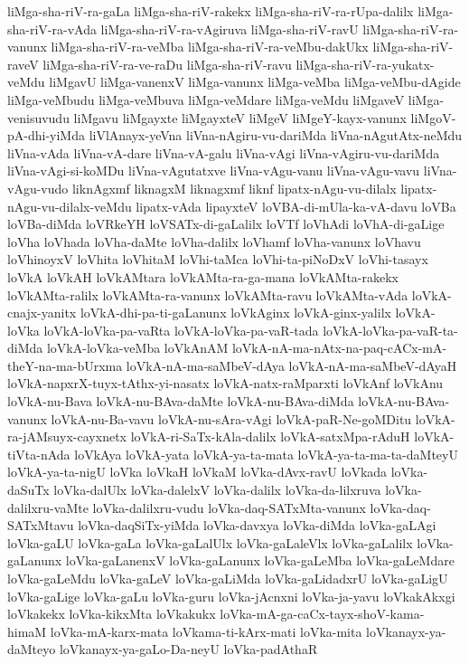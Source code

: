 {liMga-sha-riV-ra-gaLa
liMga-sha-riV-rakekx
liMga-sha-riV-ra-rUpa-dalilx
liMga-sha-riV-ra-vAda
liMga-sha-riV-ra-vAgiruva
liMga-sha-riV-ravU
liMga-sha-riV-ra-vanunx
liMga-sha-riV-ra-veMba
liMga-sha-riV-ra-veMbu-dakUkx
liMga-sha-riV-raveV
liMga-sha-riV-ra-ve-raDu
liMga-sha-riV-ravu
liMga-sha-riV-ra-yukatx-veMdu
liMgavU
liMga-vanenxV
liMga-vanunx
liMga-veMba
liMga-veMbu-dAgide
liMga-veMbudu
liMga-veMbuva
liMga-veMdare
liMga-veMdu
liMgaveV
liMga-venisuvudu
liMgavu
liMgayxte
liMgayxteV
liMgeV
liMgeY-kayx-vanunx
liMgoV-pA-dhi-yiMda
liVlAnayx-yeVna
liVna-nAgiru-vu-dariMda
liVna-nAgutAtx-neMdu
liVna-vAda
liVna-vA-dare
liVna-vA-galu
liVna-vAgi
liVna-vAgiru-vu-dariMda
liVna-vAgi-si-koMDu
liVna-vAgutatxve
liVna-vAgu-vanu
liVna-vAgu-vavu
liVna-vAgu-vudo
liknAgxmf
liknagxM
liknagxmf
liknf
lipatx-nAgu-vu-dilalx
lipatx-nAgu-vu-dilalx-veMdu
lipatx-vAda
lipayxteV
loVBA-di-mUla-ka-vA-davu
loVBa
loVBa-diMda
loVRkeYH
loVSATx-di-gaLalilx
loVTf
loVhAdi
loVhA-di-gaLige
loVha
loVhada
loVha-daMte
loVha-dalilx
loVhamf
loVha-vanunx
loVhavu
loVhinoyxV
loVhita
loVhitaM
loVhi-taMca
loVhi-ta-piNoDxV
loVhi-tasayx
loVkA
loVkAH
loVkAMtara
loVkAMta-ra-ga-mana
loVkAMta-rakekx
loVkAMta-ralilx
loVkAMta-ra-vanunx
loVkAMta-ravu
loVkAMta-vAda
loVkA-cnajx-yanitx
loVkA-dhi-pa-ti-gaLanunx
loVkAginx
loVkA-ginx-yalilx
loVkA-loVka
loVkA-loVka-pa-vaRta
loVkA-loVka-pa-vaR-tada
loVkA-loVka-pa-vaR-ta-diMda
loVkA-loVka-veMba
loVkAnAM
loVkA-nA-ma-nAtx-na-paq-cACx-mA-theY-na-ma-bUrxma
loVkA-nA-ma-saMbeV-dAya
loVkA-nA-ma-saMbeV-dAyaH
loVkA-napxrX-tuyx-tAthx-yi-nasatx
loVkA-natx-raMparxti
loVkAnf
loVkAnu
loVkA-nu-Bava
loVkA-nu-BAva-daMte
loVkA-nu-BAva-diMda
loVkA-nu-BAva-vanunx
loVkA-nu-Ba-vavu
loVkA-nu-sAra-vAgi
loVkA-paR-Ne-goMDitu
loVkA-ra-jAMsuyx-cayxnetx
loVkA-ri-SaTx-kAla-dalilx
loVkA-satxMpa-rAduH
loVkA-tiVta-nAda
loVkAya
loVkA-yata
loVkA-ya-ta-mata
loVkA-ya-ta-ma-ta-daMteyU
loVkA-ya-ta-nigU
loVka
loVkaH
loVkaM
loVka-dAvx-ravU
loVkada
loVka-daSuTx
loVka-dalUlx
loVka-dalelxV
loVka-dalilx
loVka-da-lilxruva
loVka-dalilxru-vaMte
loVka-dalilxru-vudu
loVka-daq-SATxMta-vanunx
loVka-daq-SATxMtavu
loVka-daqSiTx-yiMda
loVka-davxya
loVka-diMda
loVka-gaLAgi
loVka-gaLU
loVka-gaLa
loVka-gaLalUlx
loVka-gaLaleVlx
loVka-gaLalilx
loVka-gaLanunx
loVka-gaLanenxV
loVka-gaLanunx
loVka-gaLeMba
loVka-gaLeMdare
loVka-gaLeMdu
loVka-gaLeV
loVka-gaLiMda
loVka-gaLidadxrU
loVka-gaLigU
loVka-gaLige
loVka-gaLu
loVka-guru
loVka-jAcnxni
loVka-ja-yavu
loVkakAkxgi
loVkakekx
loVka-kikxMta
loVkakukx
loVka-mA-ga-caCx-tayx-shoV-kama-himaM
loVka-mA-karx-mata
loVkama-ti-kArx-mati
loVka-mita
loVkanayx-ya-daMteyo
loVkanayx-ya-gaLo-Da-neyU
loVka-padAthaR
}
